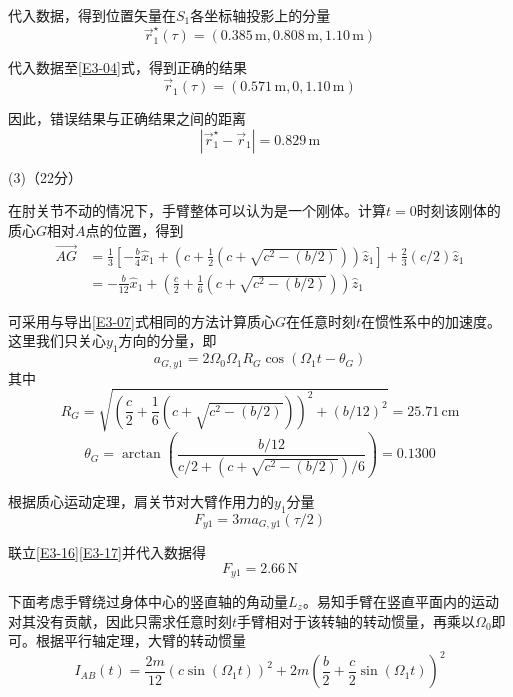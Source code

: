 \documentclass[10pt,a4paper,onecolumn,UTF8]{ctexart}
\begin{document}
	代入数据，得到位置矢量在$S_1$各坐标轴投影上的分量
	\begin{equation}
		\vec r_1^{\star}(\tau)=(0.385\,\text{m},0.808\,\text{m},1.10\,\text{m})
	\end{equation}
	
	代入数据至\eqref{E3-04}式，得到正确的结果
	\begin{equation}
		\vec r_1(\tau)=(0.571\,\text{m},0,1.10\,\text{m})
	\end{equation}
	
	因此，错误结果与正确结果之间的距离
	\begin{equation}
		|\vec r_1^{\star}-\vec r_1|=0.829\,\text{m}
	\end{equation}
	
	(3)（22分）
	
	在肘关节不动的情况下，手臂整体可以认为是一个刚体。计算$t=0$时刻该刚体的质心$G$相对$A$点的位置，得到
	\begin{equation}
		\begin{aligned}
			\overrightarrow{AG}&=\frac{1}{3}\left[-\frac b 4 \hat x_1+\left(c+\frac 1 2\left(c+\sqrt{c^2-\left(b/2\right)}\right)\right)\hat z_1\right]+\frac 2 3 (c/2)\hat z_1\\
			&=-\frac{b}{12}\hat x_1+\left(\frac c 2+\frac 1 6\left(c+\sqrt{c^2-\left(b/2\right)}\right)\right)\hat z_1
		\end{aligned}
	\end{equation}
	
	可采用与导出\eqref{E3-07}式相同的方法计算质心$G$在任意时刻$t$在惯性系中的加速度。这里我们只关心$y_1$方向的分量，即
	\begin{equation}\label{E3-16}
		a_{G,y1}=2\Omega_0\Omega_1R_G\cos(\Omega_1t-\theta_G)
	\end{equation}
	其中
	$$R_G=\sqrt{\left(\frac c 2+\frac 1 6\left(c+\sqrt{c^2-\left(b/2\right)}\right)\right)^2+(b/12)^2}=25.71\,\text{cm}$$
	$$\theta_G=\arctan\left(\frac{b/12}{c/2+\left(c+\sqrt{c^2-\left(b/2\right)}\right)/6}\right)=0.1300$$
	
	根据质心运动定理，肩关节对大臂作用力的$y_1$分量
	\begin{equation}\label{E3-17}
		F_{y1}=3ma_{G,y1}(\tau/2)
	\end{equation}
	
	联立\eqref{E3-16}\eqref{E3-17}并代入数据得
	\begin{equation}\label{E3-18}
		F_{y1}=2.66\,\text{N}
	\end{equation}
	
	下面考虑手臂绕过身体中心的竖直轴的角动量$L_z$。易知手臂在竖直平面内的运动对其没有贡献，因此只需求任意时刻$t$手臂相对于该转轴的转动惯量，再乘以$\Omega_0$即可。根据平行轴定理，大臂的转动惯量
	\begin{equation}\label{E3-19}
		I_{AB}(t)=\frac{2m}{12}(c\sin(\Omega_1t))^2+2m\left(\frac b 2+\frac c 2\sin(\Omega_1t)\right)^2
	\end{equation}
	
\end{document}
